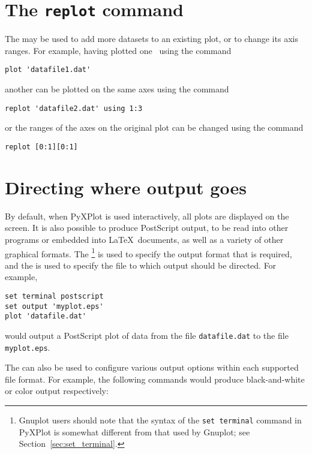 \section{The {\tt replot} command}
\label{sec:replot}

The  may be used to add more datasets to an existing plot, or
to change its axis ranges. For example, having plotted one \datafile\ using the
command

\begin{verbatim}
plot 'datafile1.dat'
\end{verbatim}

\noindent another can be plotted on the same axes using the command

\begin{verbatim}
replot 'datafile2.dat' using 1:3
\end{verbatim}

\noindent or the ranges of the axes on the original plot can be changed using
the command

\begin{verbatim}
replot [0:1][0:1]
\end{verbatim}

\section{Directing where output goes}
\label{sec:directing_output}

By default, when PyXPlot is used interactively, all plots are displayed on the
screen. It is also possible to produce PostScript output, to be read into other
programs or embedded into \LaTeX\ documents, as well as a variety of other
graphical formats. The \footnote{Gnuplot users should
note that the syntax of the {\tt set terminal} command in PyXPlot is somewhat
different from that used by Gnuplot; see Section~\ref{sec:set_terminal}.} is
used to specify the output format that is required, and the  is used to specify the file to which output should be directed. For
example,

\begin{verbatim}
set terminal postscript
set output 'myplot.eps'
plot 'datafile.dat'
\end{verbatim}

\noindent would output a PostScript plot of data from the file {\tt datafile.dat} to the file
{\tt myplot.eps}.

The  can also be used to configure various output options
within each supported file format.  For example, the following commands would
produce black-and-white or color output respectively:


